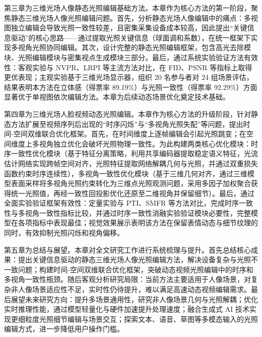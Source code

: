 第三章为三维光场人像静态光照编辑基础方法。本章作为核心方法的第一阶段，聚焦静态三维光场人像光照编辑问题。首先，分析静态光场人像编辑中的痛点：多视图独立编辑会导致光照一致性较差，且密集采集设备成本较高，因此提出“关键信息驱动”的核心思路——通过提取光照关键信息（球面调和系数），在统一框架下实现多视角光照协同编辑。其次，设计完整的静态光照编辑框架，包含高光去除模块、光照编辑模块与密集视点生成模块三部分。最后，通过系统实验验证方法有效性：客观实验与 NVPR、LRPI 等主流方法对比，在 FID、PSNR 等指标上取得更优表现；主观实验基于三维光场显示器，组织 20 名参与者对 24 组场景评估，结果表明本方法在立体感（得票率 89.19\%）与光照一致性（得票率 92.29\%）方面显著优于单视图依次编辑方法。本章为后续动态场景优化奠定技术基础。

第四章为三维光场人脸视频动态光照编辑。本章作为核心方法的升级阶段，针对静态方法扩展至视频序列后出现的“时序闪烁”与“多视角光照失配”等问题，提出时间-空间双维联合优化框架。首先，在时间维度上逐帧编辑会引起光照跳变；在空间维度上多视角独立优化会破坏光照物理一致性。为此构建两类核心优化模块：时序一致性优化模块（基于特征分离策略，利用共享编码器提取稳定语义特征，光流估计网络实现跨帧空间对齐，光照特征提取网络解耦几何与光照，并通过双重损失函数约束时序连续性），多视角一致性优化模块（基于三维几何对齐，通过三维模型表面采样将多视角光照约束转化为三维点光照观测问题，采用多因子加权聚合获得统一光照值，再经一致性回投影优化还原至二维视角并保留细节）。最后，通过全面实验验证框架有效性：定量实验与 PTI、SMFR 等方法对比，完成时序一致性与多视角一致性指标比较，并通过时序一致性消融实验验证模块必要性，完整模型在各项指标中表现最佳；视觉效果展示表明该方法在保留表情动态与细节纹理的同时，有效抑制光照闪烁和视角偏移。

第五章为总结与展望。本章对全文研究工作进行系统梳理与提升。首先总结核心成果：提出关键信息驱动的静态三维光场人像光照编辑方法，解决设备复杂与光照不一致问题；构建时间-空间双维联合优化框架，突破动态视频光照编辑中的时序和多视角一致性瓶颈。随后客观分析研究局限：当前方法主要适用于人像场景，对复杂非人像场景适应性不足，实时性仍待提升，难以满足高速动态视频编辑需求。最后展望未来研究方向：提升多场景通用性，研究非人像场景几何与光照解耦；优化实时推理性能，通过模型轻量化与硬件加速提升处理速度；融合生成式 AI 技术实现更细粒度光照细节编辑与场景交互；探索文本、语音、草图等多模态输入的光照编辑方式，进一步降低用户操作门槛。




